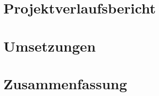 \documentclass[11pt,twoside,a4paper]{article}
\begin{document}
\section{Projektverlaufsbericht}
\section{Umsetzungen}

\section{Zusammenfassung}


\newpage

\begin{thebibliography}{12}




\end{thebibliography}


\end{document}

